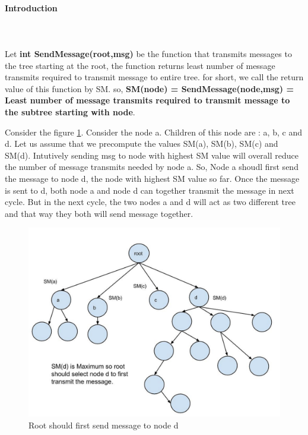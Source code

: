 \paragraph{Introduction} \\
\\
Let \textbf{int  SendMessage(root,msg)} be the function that transmits messages to the tree starting at the root, the function returns least number of message transmits required to transmit message to entire tree. 
for short, we call the return value of this function by SM. 
so, \textbf{SM(node) = SendMessage(node,msg) = Least number of message transmits required to transmit message to the subtree starting with node}. 

Consider the figure \ref{fig:4a}. Consider the node a. Children of this node are : a, b, c and d. Let us assume that we precompute the values SM(a), SM(b), SM(c) and SM(d). Intutively sending msg to node with highest SM value will overall reduce the number of message transmits needed by node a. So, Node a shoudl first send the message to node d, the node with highest SM value so far. Once the message is sent to d,  both node a and node d can together transmit the message in next cycle. But in the next cycle, the two nodes a and d will act as two different tree and that way they both will send message together.

\begin{figure}[4a]
    \centering
    \includegraphics[scale=0.10]{4a}
    \caption{Root should first send message to node d}
    \label{fig:4a}
\end{figure}


